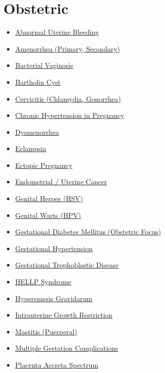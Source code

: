 \section*{Obstetric}
\label{sec:organ_obstetric}
\begin{itemize}[noitemsep]
  \item \hyperlink{sec:Abnormal Uterine Bleeding}{Abnormal Uterine Bleeding}
  \item \hyperlink{sec:Amenorrhea}{Amenorrhea (Primary, Secondary)}
  \item \hyperlink{sec:Bacterial Vaginosis}{Bacterial Vaginosis}
  \item \hyperlink{sec:Bartholin Cyst}{Bartholin Cyst}
  \item \hyperlink{sec:Cervicitis}{Cervicitis (Chlamydia, Gonorrhea)}
  \item \hyperlink{sec:Chronic Hypertension in Pregnancy}{Chronic Hypertension in Pregnancy}
  \item \hyperlink{sec:Dysmenorrhea}{Dysmenorrhea}
  \item \hyperlink{sec:Eclampsia}{Eclampsia}
  \item \hyperlink{sec:Ectopic Pregnancy}{Ectopic Pregnancy}
  \item \hyperlink{sec:Endometrial Cancer}{Endometrial / Uterine Cancer}
  \item \hyperlink{sec:Genital Herpes}{Genital Herpes (HSV)}
  \item \hyperlink{sec:Genital Warts}{Genital Warts (HPV)}
  \item \hyperlink{sec:obstetric:Gestational Diabetes Mellitus}{Gestational Diabetes Mellitus (Obstetric Focus)}
  \item \hyperlink{sec:Gestational Hypertension}{Gestational Hypertension}
  \item \hyperlink{sec:Gestational Trophoblastic Disease}{Gestational Trophoblastic Disease}
  \item \hyperlink{sec:HELLP Syndrome}{HELLP Syndrome}
  \item \hyperlink{sec:Hyperemesis Gravidarum}{Hyperemesis Gravidarum}
  \item \hyperlink{sec:Intrauterine Growth Restriction}{Intrauterine Growth Restriction}
  \item \hyperlink{sec:Mastitis}{Mastitis (Puerperal)}
  \item \hyperlink{sec:Multiple Gestation Complications}{Multiple Gestation Complications}
  \item \hyperlink{sec:Placenta Accreta Spectrum}{Placenta Accreta Spectrum}

\end{itemize}
